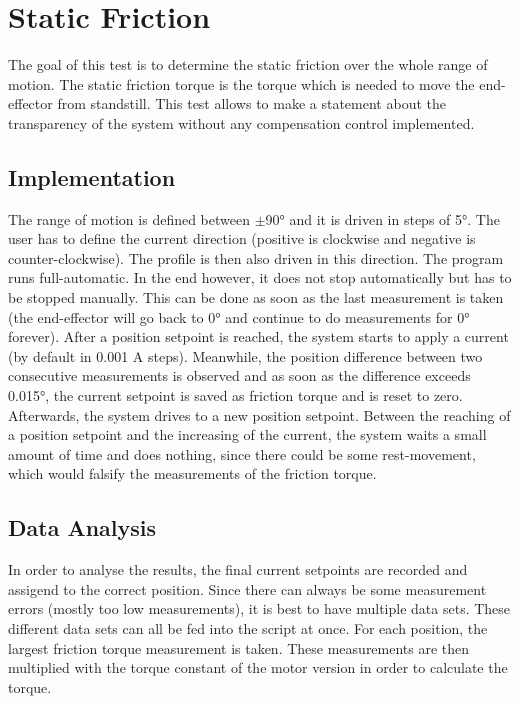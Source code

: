 \section{Static Friction}

The goal of this test is to determine the static friction over the whole range of motion. The static friction torque is the torque which is needed to move the end-effector from standstill. This test allows to make a statement about the transparency of the system without any compensation control implemented. 

\subsection{Implementation}

The range of motion is defined between $\pm$90° and it is driven in steps of 5°. The user has to define the current direction (positive is clockwise and negative is counter-clockwise). The profile is then also driven in this direction. The program runs full-automatic. In the end however, it does not stop automatically but has to be stopped manually. This can be done as soon as the last measurement is taken (the end-effector will go back to 0° and continue to do measurements for 0° forever). After a position setpoint is reached, the system starts to apply a current (by default in 0.001 A steps). Meanwhile, the position difference between two consecutive measurements is observed and as soon as the difference exceeds 0.015°, the current setpoint is saved as friction torque and is reset to zero. Afterwards, the system drives to a new position setpoint. Between the reaching of a position setpoint and the increasing of the current, the system waits a small amount of time and does nothing, since there could be some rest-movement, which would falsify the measurements of the friction torque.

\subsection{Data Analysis}

In order to analyse the results, the final current setpoints are recorded and assigend to the correct position. Since there can always be some measurement errors (mostly too low measurements), it is best to have multiple data sets. These different data sets can all be fed into the script at once. For each position, the largest friction torque measurement is taken. These measurements are then multiplied with the torque constant of the motor version in order to calculate the torque.

